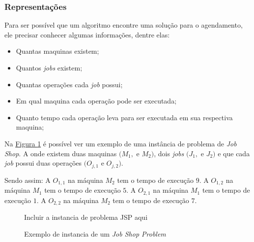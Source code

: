         \subsubsection{Representações}
            Para ser possível que um algoritmo encontre uma solução para o agendamento, ele precisar conhecer algumas informações, dentre elas: 
            \begin{itemize}
                \item Quantas maquinas existem;
                \item Quantos \textit{jobs} existem;
                \item Quantas operações cada \textit{job} possui;
                \item Em qual maquina cada operação pode ser executada;
                \item Quanto tempo cada operação leva para ser executada em sua respectiva maquina;
            \end{itemize}


            Na 
            \hyperref[fig:ex-instancia-problema-JSP]{Figura \ref{fig:ex-instancia-problema-JSP}}
            é possível ver um exemplo de uma instância de problema de \textit{Job Shop}. A onde existem duas maquinas $(M_1, $ e $M_2)$, dois \textit{jobs} $(J_1, $ e $J_2)$ e que cada \textit{job} possui duas operações $(O_{j,1} $ e $O_{j,2})$.\newline
            
            Sendo assim:\newline
            A $O_{1,1}$ na máquina $M_2$ tem o tempo de execução $9$.\newline 
            A $O_{1,2}$ na máquina $M_1$ tem o tempo de execução $5$.\newline
            A $O_{2,1}$ na máquina $M_1$ tem o tempo de execução $1$.\newline
            A $O_{2,2}$ na máquina $M_2$ tem o tempo de execução $7$.\newline

            \begin{figure}[ht]
                \centering
                \small{Incluir a instancia de problema JSP aqui}
                \caption{Exemplo de instancia de um \textit{Job Shop Problem}}
                \label{fig:ex-instancia-problema-JSP}
            \end{figure}
            
